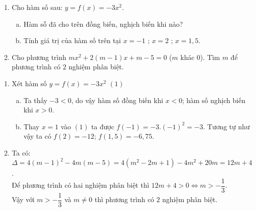 \begin{ex}%
	\hfill
    \begin{enumerate}[1.]    
        \item Cho hàm số sau: $y= f(x)=-3x^2$.
        \begin{enumerate}[a)]
        	\item  Hàm sỗ đã cho trên đồng biến, nghịch biến khi nào?
        	\item  Tính giá trị của hàm số trên tại $x =-1$ ; $x= 2$ ; $x= 1,5$.
        \end{enumerate}
        \item Cho phương trình $mx^2+2(m-1)x+m-5 = 0$ ($m$ khác $0$). Tìm $m$ để phương trình có $2$ nghiệm phân biệt.
    \end{enumerate}
\loigiai
    {
    
    \begin{enumerate}[1.]    
    	\item Xét hàm số $y= f(x)=-3x^2$  $(1)$
    		\begin{enumerate}[a)]
    		\item  Ta thấy $-3<0$, do vậy hàm số đồng biến khi $x <0$; hàm số nghịch biến khi $x > 0$.
   	    	\item  Thay $x= 1$ vào $(1)$ ta được $f(-1)=-3.(-1)^2=-3$. Tương tự như vậy ta có $f(2)=-12$; $f (1,5)=-6,75$. 
    	   	\end{enumerate}
    	\item Ta có: $\Delta= 4(m-1)^2-4m(m-5)=4(m^2-2m+1)-4m^2+20m=12m+4$.\\ 
    	Để phương trình có hai nghiệm phân biệt thì $12m+4>0\Leftrightarrow m >-\dfrac{1}{3}$.\\
    	Vậy với $m>-\dfrac{1}{3}$ và $m\neq 0$ thì phương trình có $2$ nghiệm phân biệt. 
      \end{enumerate}  
       }
\end{ex}


